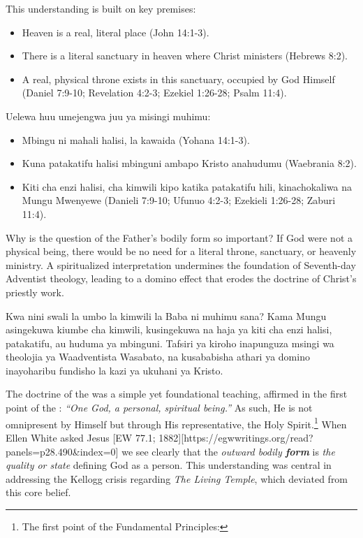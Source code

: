 This understanding is built on key premises:
\begin{itemize}
    \item Heaven is a real, literal place (John 14:1-3).
    \item There is a literal sanctuary in heaven where Christ ministers (Hebrews 8:2). 
    \item A real, physical throne exists in this sanctuary, occupied by God Himself (Daniel 7:9-10; Revelation 4:2-3; Ezekiel 1:26-28; Psalm 11:4).
\end{itemize}


Uelewa huu umejengwa juu ya misingi muhimu:
\begin{itemize}
    \item Mbingu ni mahali halisi, la kawaida (Yohana 14:1-3).
    \item Kuna patakatifu halisi mbinguni ambapo Kristo anahudumu (Waebrania 8:2). 
    \item Kiti cha enzi halisi, cha kimwili kipo katika patakatifu hili, kinachokaliwa na Mungu Mwenyewe (Danieli 7:9-10; Ufunuo 4:2-3; Ezekieli 1:26-28; Zaburi 11:4).
\end{itemize}


Why is the question of the Father’s bodily form so important? If God were not a physical being, there would be no need for a literal throne, sanctuary, or heavenly ministry. A spiritualized interpretation undermines the foundation of Seventh-day Adventist theology, leading to a domino effect that erodes the doctrine of Christ’s priestly work.


Kwa nini swali la umbo la kimwili la Baba ni muhimu sana? Kama Mungu asingekuwa kiumbe cha kimwili, kusingekuwa na haja ya kiti cha enzi halisi, patakatifu, au huduma ya mbinguni. Tafsiri ya kiroho inapunguza msingi wa theolojia ya Waadventista Wasabato, na kusababisha athari ya domino inayoharibu fundisho la kazi ya ukuhani ya Kristo.


The doctrine of the  was a simple yet foundational teaching, affirmed in the first point of the : \textit{“One God, a personal, spiritual being.”} As such, He is not omnipresent by Himself but through His representative, the Holy Spirit.\footnote{The first point of the Fundamental Principles: } When Ellen White asked Jesus [EW 77.1; 1882][https://egwwritings.org/read?panels=p28.490&index=0] we see clearly that the \textit{outward bodily \textbf{form}} is \textit{the quality or state} defining God as a person. This understanding was central in addressing the Kellogg crisis regarding \textit{The Living Temple}, which deviated from this core belief.


